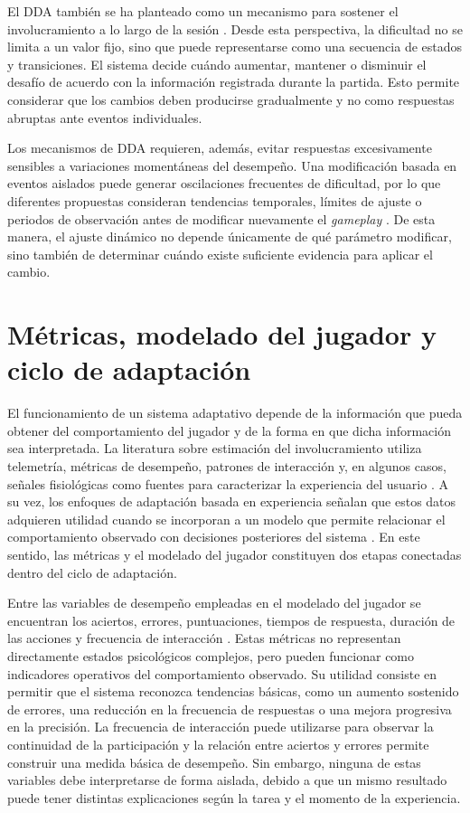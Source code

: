 El DDA también se ha planteado como un mecanismo para sostener el 
involucramiento a lo largo de la sesión \cite{xue2017dda}. Desde esta 
perspectiva, la dificultad no se limita a un valor fijo, sino que puede 
representarse como una secuencia de estados y transiciones. El sistema 
decide cuándo aumentar, mantener o disminuir el desafío de acuerdo con 
la información registrada durante la partida. Esto permite considerar 
que los cambios deben producirse gradualmente y no como respuestas 
abruptas ante eventos individuales.

Los mecanismos de DDA requieren, además, evitar respuestas excesivamente 
sensibles a variaciones momentáneas del desempeño. Una modificación 
basada en eventos aislados puede generar oscilaciones frecuentes de 
dificultad, por lo que diferentes propuestas consideran tendencias 
temporales, límites de ajuste o periodos de observación antes de 
modificar nuevamente el \textit{gameplay} \cite{zook2012temporal,xue2017dda,zohaib2018dda}.
De esta manera, el ajuste dinámico no depende únicamente de qué 
parámetro modificar, sino también de determinar cuándo existe 
suficiente evidencia para aplicar el cambio.

\section{Métricas, modelado del jugador y ciclo de adaptación}
El funcionamiento de un sistema adaptativo depende de la información que 
pueda obtener del comportamiento del jugador y de la forma en que dicha 
información sea interpretada. La literatura sobre estimación del 
involucramiento utiliza telemetría, métricas de desempeño, patrones de 
interacción y, en algunos casos, señales fisiológicas como fuentes para 
caracterizar la experiencia del usuario \cite{rashed2025engagement}. A 
su vez, los enfoques de adaptación basada en experiencia señalan que 
estos datos adquieren utilidad cuando se incorporan a un modelo que 
permite relacionar el comportamiento observado con decisiones 
posteriores del sistema \cite{lopes2025closing}. En este sentido, las 
métricas y el modelado del jugador constituyen dos etapas conectadas 
dentro del ciclo de adaptación.

Entre las variables de desempeño empleadas en el modelado del jugador se 
encuentran los aciertos, errores, puntuaciones, tiempos de respuesta, 
duración de las acciones y frecuencia de interacción \cite{zook2012temporal,zohaib2018dda}.
Estas métricas no representan directamente estados psicológicos 
complejos, pero pueden funcionar como indicadores operativos del 
comportamiento observado. Su utilidad consiste en permitir que el 
sistema reconozca tendencias básicas, como un aumento sostenido de 
errores, una reducción en la frecuencia de respuestas o una mejora 
progresiva en la precisión. La frecuencia de interacción puede 
utilizarse para observar la continuidad de la participación y la 
relación entre aciertos y errores permite construir una medida básica de 
desempeño. Sin embargo, ninguna de estas variables debe interpretarse de 
forma aislada, debido a que un mismo resultado puede tener distintas 
explicaciones según la tarea y el momento de la experiencia.

